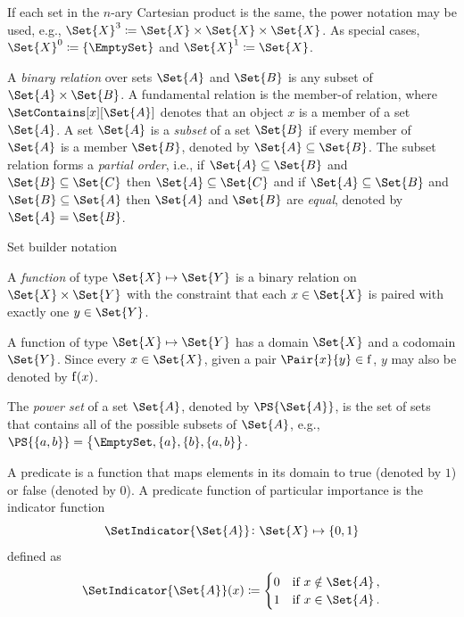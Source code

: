 \documentclass[10pt,final,hidelinks]{article}
\numberwithin{equation}{section}
\begin{document}
If each set in the $n$-ary Cartesian product is the same, the power notation may be used, e.g., $\Set{X}^3 \coloneqq \Set{X} \times \Set{X} \times \Set{X}$.
As special cases, $\Set{X}^0 \coloneqq \{ \EmptySet \}$ and $\Set{X}^1 \coloneqq \Set{X}$.

A \emph{binary relation} over sets $\Set{A}$ and $\Set{B}$ is any subset of $\Set{A} \times \Set{B}$.
A fundamental relation is the member-of relation, where $\SetContains[x][\Set{A}]$ denotes that an object $x$ is a member of a set $\Set{A}$.
A set $\Set{A}$ is a \emph{subset} of a set $\Set{B}$ if every member of $\Set{A}$ is a member $\Set{B}$, denoted by $\Set{A} \subseteq \Set{B}$.
The subset relation forms a \emph{partial order}, i.e., if $\Set{A} \subseteq \Set{B}$ and $\Set{B} \subseteq \Set{C}$ then $\Set{A} \subseteq \Set{C}$ and 
if $\Set{A} \subseteq \Set{B}$ and $\Set{B} \subseteq \Set{A}$ then $\Set{A}$ and $\Set{B}$ are \emph{equal}, denoted by $\Set{A} = \Set{B}$.


\begin{definition}
	Set builder notation
\end{definition}


\begin{definition}
	A \emph{function} of type $\Set{X} \mapsto \Set{Y}$ is a binary relation on $\Set{X} \times \Set{Y}$ with the constraint that each $x \in \Set{X}$ is paired with exactly one $y \in \Set{Y}$.
\end{definition}
A function of type $\Set{X} \mapsto \Set{Y}$ has a domain $\Set{X}$ and a codomain $\Set{Y}$.
Since every $x \in \Set{X}$, given a pair $\Pair{x}{y} \in \Fun{f}$, $y$ may also be denoted by $\Fun{f}(x)$.

The \emph{power set} of a set $\Set{A}$, denoted by $\PS{\Set{A}}$, is the set of sets that contains all of the possible subsets of $\Set{A}$, e.g., $\PS{\{a, b\}}= \left\{ \EmptySet, \{a\}, \{b\}, \{a, b\} \right\}$.

A predicate is a function that maps elements in its domain to true (denoted by $1$) or false (denoted by $0$).
A predicate function of particular importance is the indicator function
\begin{equation}
	\SetIndicator{\Set{A}} \colon \Set{X} \mapsto \{0,1\}
\end{equation}
defined as
\begin{equation}
	\SetIndicator{\Set{A}}(x) \coloneqq
	\begin{cases}
		0 & \text{if $x \notin \Set{A}$}\,,\\
		1 & \text{if $x \in \Set{A}$}\,.
	\end{cases}
\end{equation}
\end{document}
